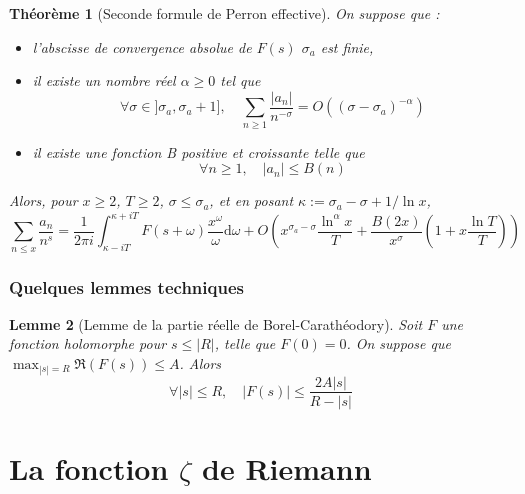 \documentclass[french]{report}
\newtheorem{theorem}{Théorème}[section]
\newtheorem{lemma}[theorem]{Lemme}
\begin{document}
\begin{theorem}[Seconde formule de Perron effective]\label{eq:perron-2-effective}
  On suppose que :
  \begin{itemize}
    \item l'abscisse de convergence absolue de $F(s)$ $\sigma_a$ est finie,
    \item il existe un nombre réel $\alpha\geq0$ tel que
    \[ \forall\sigma\in]\sigma_a,\sigma_a+1],\quad\sum_{n\geq1}\frac{|a_n|}{n^{-\sigma}}=O((\sigma-\sigma_a)^{-\alpha}) \]
    \item il existe une fonction B positive et croissante telle que
    \[ \forall n\geq1,\quad|a_n|\leq B(n) \]
  \end{itemize}
  Alors, pour $x\geq2$, $T\geq2$, $\sigma\leq\sigma_a$, et en posant $\kappa:=\sigma_a-\sigma+1/\ln x$,
  \[ \sum_{n\leq x}\frac{a_n}{n^s}=\frac{1}{2\pi i}\int_{\kappa-iT}^{\kappa+iT}F(s+\omega)\frac{x^\omega}{\omega}\mathrm{d}\omega + O\left(x^{\sigma_a-\sigma}\frac{\ln^\alpha x}{T}+\frac{B(2x)}{x^\sigma}\left(1+x\frac{\ln T}{T}\right)\right) \]
\end{theorem}

\subsection{Quelques lemmes techniques}

\begin{lemma}[Lemme de la partie réelle de Borel-Carathéodory]\label{lem:borel-caratheodory}
  Soit $F$ une fonction holomorphe pour $s\leq|R|$, telle que $F(0)=0$. On suppose que $\max_{|s|=R}\Re(F(s))\leq A$. Alors
  \[
    \forall |s|\leq R,\quad|F(s)|\leq\frac{2A|s|}{R-|s|}  
  \]
\end{lemma}

\chapter{La fonction $\zeta$ de Riemann}
\end{document}
